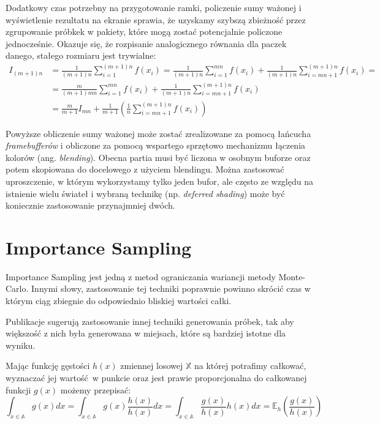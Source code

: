 \documentclass[../main.tex]{subfiles}
\begin{document}
Dodatkowy czas potrzebny na przygotowanie ramki, policzenie sumy ważonej i
wyświetlenie rezultatu na ekranie sprawia, że uzyskamy szybszą zbieżność przez
zgrupowanie próbkek w pakiety, które mogą zostać potencjalnie policzone
jednocześnie. Okazuje się, że rozpisanie analogicznego równania dla paczek
danego, stałego rozmiaru jest trywialne:
\begin{align*}
  I_{(m+1)n} &= \frac{1}{(m+1)n} \sum_{i=1}^{(m+1)n} f(x_i)
  = \frac{1}{(m+1)n} \sum_{i=1}^{mn} f(x_i)
    + \frac{1}{(m+1)n} \sum_{i=mn+1}^{(m+1)n} f(x_i) = \\
  &= \frac{m}{(m+1)mn} \sum_{i=1}^{mn} f(x_i)
    + \frac{1}{(m+1)n} \sum_{i=mn+1}^{(m+1)n} f(x_i) \\
  &= \frac{m}{m+1}I_{mn}
    + \frac{1}{m+1} \left(
        \frac{1}{n} \sum_{i=mn+1}^{(m+1)n} f(x_i)
    \right)
\end{align*}

Powyższe obliczenie sumy ważonej może zostać zrealizowane za pomocą łańcucha \textit{framebufferów} i obliczone za pomocą wspartego sprzętowo mechanizmu łączenia kolorów (ang. \textit{blending}). Obecna partia musi być liczona w osobnym buforze oraz potem skopiowana do docelowego z użyciem blendingu. Można zastosować uproszczenie, w którym wykorzystamy tylko jeden bufor, ale często ze względu na istnienie wielu świateł i wybraną technikę (np. \textit{deferred shading}) może być koniecznie zastosowanie przynajmniej dwóch.

\section{Importance Sampling}

Importance Sampling jest jedną z metod ograniczania wariancji metody
Monte-Carlo. Innymi słowy, zastosowanie tej techniki poprawnie powinno
skrócić czas w którym ciąg zbiegnie do odpowiednio bliskiej wartości całki.

Publikacje \cite{Veach,MonteCarloAnderson} sugerują zastosowanie innej
techniki generowania próbek, tak aby większość z nich była generowana w
miejsach, które są bardziej istotne dla wyniku.

Mając funkcję gęstości $h(x)$ zmiennej losowej $\mathbb{X}$ na której potrafimy całkować, wyznaczać jej wartość w punkcie oraz jest prawie proporcjonalna do całkowanej funkcji $g(x)$ możemy przepisać:
\[
  \int_{x \in \mathbb{A}} { g(x) dx } =
  \int_{x \in \mathbb{A}} { g(x) \frac{h(x)}{h(x)} dx } =
  \int_{x \in \mathbb{A}} { \frac{g(x)}{h(x)} h(x) dx } =
  \mathbb{E}_{h}\left({ \frac{g(x)}{h(x)} }\right)
\]
\end{document}
